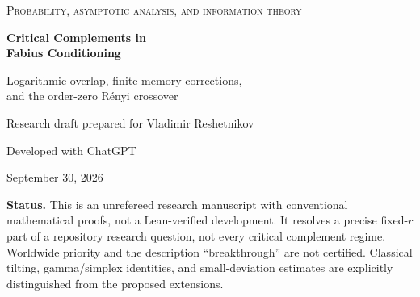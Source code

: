 \documentclass[11pt,oneside]{article}
\numberwithin{equation}{section}
\theoremstyle{plain}
\theoremstyle{definition}
\theoremstyle{remark}
\newcommand{\TV}{d_{\mathrm{TV}}}
\newcommand{\repo}{\texttt{ProveIt}}
\begin{document}
\hypersetup{pageanchor=false}
\begin{titlepage}
\vspace*{12mm}
{\large\scshape Probability, asymptotic analysis, and information theory\par}
\vspace{12mm}
{\Huge\bfseries Critical Complements in\\[3mm] Fabius Conditioning\par}
\vspace{8mm}
{\Large Logarithmic overlap, finite-memory corrections,\\
and the order-zero R\'enyi crossover\par}
\vspace{14mm}
{\large Research draft prepared for Vladimir Reshetnikov\par}
{\normalsize Developed with ChatGPT\par}
\vspace{3mm}
{\large September 30, 2026\par}
\vspace{13mm}
\begin{abstract}
Exponential tilting turns a very small value of a geometric uniform
random series into a typical mean constraint. Previous work in the
\repo{} repository classifies the conditional law of a coordinate block
by its share of the tilted variance, but leaves the critical complement
regime as an explicit research question. We resolve the fixed-complement
case for geometric weights. After observing the active coordinates except
for a fixed number $r$ of early digits, the likelihood ratio reduces,
eventually exactly, to a density $h_r$ of a tilted boundary tail plus an
independent gamma variable. This gives the overlap expansion
\[
 1-\TV(P_{n,r},Q_{n,r})
 =\frac{\Lambda_n+r\log\Lambda_n+\log K-\log(r!)+1+o(1)}
 {\sqrt{2\pi n}},\qquad \Lambda_n=\tfrac12\log(2\pi n).
\]
A polynomial tail formula yields an all-orders inverse-logarithmic
expansion and an explicit residual endpoint defect. Every fixed positive
R\'enyi order has divergence $\Lambda_n$ minus the corresponding
boundary differential entropy, whereas order zero tends to $\log 2$.
We identify the intervening scale $\alpha\sqrt n=O(1)$ and its universal
normal-tail profile. With no early digit omitted, the remaining overlap
correction is positive and has logarithm asymptotic to
$-\sqrt{\log(1/q)\log n}$: the flat Fabius endpoint is visible in a
configuration-level information statistic. Proofs are self-contained;
228 exact algebra checks and reproducible numerical diagnostics accompany
the article.
\end{abstract}
\vfill
\noindent\small
\textbf{Status.} This is an unrefereed research manuscript with conventional
mathematical proofs, not a Lean-verified development. It resolves a precise
fixed-$r$ part of a repository research question, not every critical
complement regime. Worldwide priority and the description ``breakthrough''
are not certified. Classical tilting, gamma/simplex identities, and
small-deviation estimates are explicitly distinguished from the proposed
extensions.
\end{titlepage}
\end{document}
